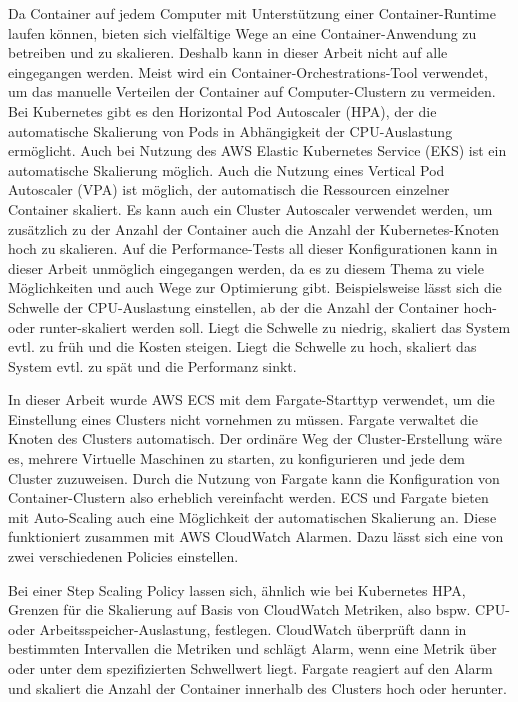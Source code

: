 Da Container auf jedem Computer mit Unterstützung einer Container-Runtime laufen können, bieten sich vielfältige Wege an eine Container-Anwendung zu betreiben und zu skalieren. Deshalb kann in dieser Arbeit nicht auf alle eingegangen werden. Meist wird ein Container-Orchestrations-Tool verwendet, um das manuelle Verteilen der Container auf Computer-Clustern zu vermeiden. Bei Kubernetes gibt es den Horizontal Pod Autoscaler (HPA), der die automatische Skalierung von Pods in Abhängigkeit der CPU-Auslastung ermöglicht\cite{noauthor_horizontal_nodate-1}. Auch bei Nutzung des AWS Elastic Kubernetes Service (EKS) ist ein automatische Skalierung möglich\cite{noauthor_horizontal_nodate}. Auch die Nutzung eines Vertical Pod Autoscaler (VPA) ist möglich, der automatisch die Ressourcen einzelner Container skaliert\cite{noauthor_vertical_nodate}. Es kann auch ein Cluster Autoscaler verwendet werden, um zusätzlich zu der Anzahl der Container auch die Anzahl der Kubernetes-Knoten hoch zu skalieren\cite{noauthor_cluster_nodate}.
Auf die Performance-Tests all dieser Konfigurationen kann in dieser Arbeit unmöglich eingegangen werden, da es zu diesem Thema zu viele Möglichkeiten und auch Wege zur Optimierung gibt. Beispielsweise lässt sich die Schwelle der CPU-Auslastung einstellen, ab der die Anzahl der Container hoch- oder runter-skaliert werden soll. Liegt die Schwelle zu niedrig, skaliert das System evtl. zu früh und die Kosten steigen. Liegt die Schwelle zu hoch, skaliert das System evtl. zu spät und die Performanz sinkt.

In dieser Arbeit wurde AWS ECS mit dem Fargate-Starttyp verwendet, um die Einstellung eines Clusters nicht vornehmen zu müssen. Fargate verwaltet die Knoten des Clusters automatisch. Der ordinäre Weg der Cluster-Erstellung wäre es, mehrere Virtuelle Maschinen zu starten, zu konfigurieren und jede dem Cluster zuzuweisen. Durch die Nutzung von Fargate kann die Konfiguration von Container-Clustern also erheblich vereinfacht werden. ECS und Fargate bieten mit Auto-Scaling auch eine Möglichkeit der automatischen Skalierung an. Diese funktioniert zusammen mit AWS CloudWatch Alarmen. Dazu lässt sich eine von zwei verschiedenen Policies einstellen.

Bei einer Step Scaling Policy lassen sich, ähnlich wie bei Kubernetes HPA, Grenzen für die Skalierung auf Basis von CloudWatch Metriken, also bspw. CPU- oder Arbeitsspeicher-Auslastung, festlegen. CloudWatch überprüft dann in bestimmten Intervallen die Metriken und schlägt Alarm, wenn eine Metrik über oder unter dem spezifizierten Schwellwert liegt. Fargate reagiert auf den Alarm und skaliert die Anzahl der Container innerhalb des Clusters hoch oder herunter. 

